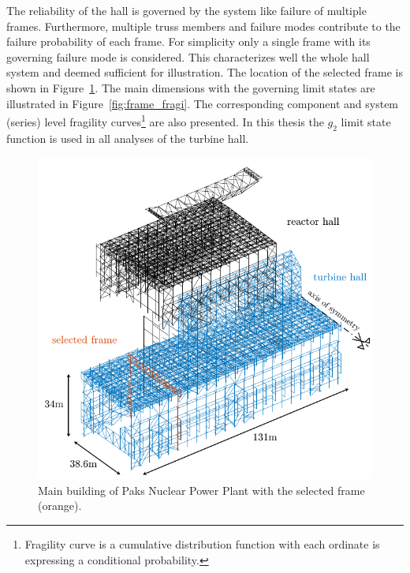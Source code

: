 The reliability of the hall is governed by the system like failure of multiple frames. Furthermore, multiple truss members and failure modes contribute to the failure probability of each frame. For simplicity only a single frame with its governing failure mode is considered. This characterizes well the whole hall system and deemed sufficient for illustration. The location of the selected frame is shown in Figure~\ref{fig:main_building_overview}. The main dimensions with the governing limit states are illustrated in Figure~\ref{fig:frame_fragi}. The corresponding component and system (series) level fragility curves\footnote{Fragility curve is a cumulative distribution function with each ordinate is expressing a conditional probability.} are also presented. In this thesis the $g_2$ limit state function is used in all analyses of the turbine hall.

\begin{figure}[htbp!] 
	\centering    
	\includegraphics[]{main_building_overview_02.pdf}
	\caption{Main building of Paks Nuclear Power Plant with the selected frame (orange).}
	\label{fig:main_building_overview}
\end{figure}


